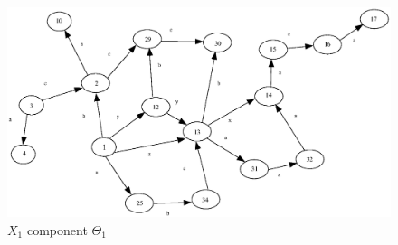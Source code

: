\documentclass[a4paper,12pt]{article}
\numberwithin{equation}{section}
\numberwithin{figure}{section}
\begin{document}
\begin{figure}
\begin{center}
\includegraphics[scale=0.5, bb=0 0 680 480]{python/ex_K_f1.eps}
\caption{$X_1$ component $\Theta_1$}
\label{fig:K_f1}
\end{center}
\end{figure}
\end{document}
